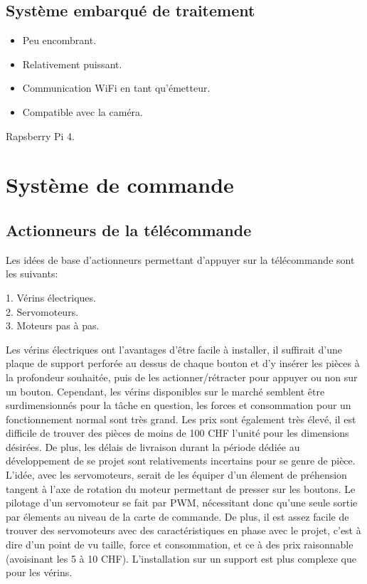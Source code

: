 \subsection{Système embarqué de traitement}
\begin{itemize}
    \item Peu encombrant.
    \item Relativement puissant.
    \item Communication WiFi en tant qu'émetteur.
    \item Compatible avec la caméra.
\end{itemize}
Rapsberry Pi 4.


\section{Système de commande}
\subsection{Actionneurs de la télécommande}
Les idées de base d'actionneurs permettant d'appuyer sur la télécommande sont les suivants:
\begin{listage}
    1. Vérins électriques.\\
    2. Servomoteurs.\\
    3. Moteurs pas à pas.
\end{listage}

Les vérins électriques ont l'avantages d'être facile à installer, il suffirait d'une plaque de support perforée au dessus de chaque bouton et d'y insérer
les pièces à la profondeur souhaitée, puis de les actionner/rétracter pour appuyer ou non sur un bouton. Cependant, les vérins disponibles sur le marché semblent être surdimensionnés pour la tâche en question, les forces et
consommation pour un fonctionnement normal sont très grand. Les prix sont également très élevé, il est difficile de trouver des pièces de moins de 100 CHF l'unité
pour les dimensions désirées. De plus, les délais de livraison durant la période dédiée au développement de se projet sont relativements incertains pour se genre de pièce.\\

L'idée, avec les servomoteurs, serait de les équiper d'un élement de préhension tangent à l'axe de rotation du moteur permettant de presser sur les boutons.
Le pilotage d'un servomoteur se fait par PWM, nécessitant donc qu'une seule sortie par élements au niveau de la carte de commande. De plus, il est assez facile de
trouver des servomoteurs avec des caractéristiques en phase avec le projet, c'est à dire d'un point de vu taille, force et consommation, et ce à des prix
raisonnable (avoisinant les 5 à 10 CHF). L'installation sur un support est plus complexe que pour les vérins.\\

